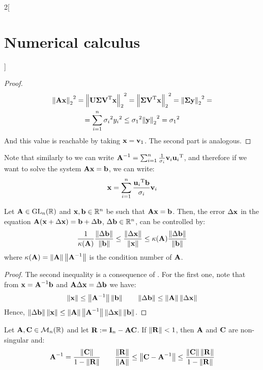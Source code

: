 \documentclass[../../../main_math.tex]{subfiles}
\begin{document}
\begin{multicols}{2}[\section{Numerical calculus}]
\begin{proof}
    \begin{multline*}
      {\norm{\vf{Ax}}_2}^2={\norm{\vf{U}\vf{\Sigma}\transpose{\vf{V}}\vf{x}}_2}^2={\norm{\vf{\Sigma}\transpose{\vf{V}}\vf{x}}_2}^2={\norm{\vf\Sigma \vf{y}}_2}^2 =\\= \sum_{i=1}^n {\sigma_i}^2 {y_i}^2 \leq {\sigma_1}^2{\norm{\vf{y}}_2}^2 = {\sigma_1}^2
    \end{multline*}
    And this value is reachable by taking $\vf{x}=\vf{v}_1$. The second part is analogous.
  \end{proof}
  \begin{remark}
    Note that similarly to  we can write $\vf{A}^{-1}= \sum_{i=1}^n \frac{1}{\sigma_i} \vf{v}_i\transpose{\vf{u}_i}$, and therefore if we want to solve the system $\vf{Ax}=\vf{b}$, we can write:
    $$
      \vf{x} = \sum_{i=1}^n \frac{\transpose{\vf{u}_i}\vf{b}}{\sigma_i}\vf{v}_i
    $$
  \end{remark}
  \begin{theorem}
    Let $\vf{A}\in\GL_n(\RR)$ and $\vf{x}, \vf{b}\in\RR^n$ be such that $\vf{Ax}=\vf{b}$. Then, the error $\Delta \vf{x}$ in the equation $\vf{A}(\vf{x}+\Delta\vf{x})=\vf{b} + \Delta\vf{b}$, $\Delta \vf{b}\in\RR^n$, can be controlled by:
    $$
      \frac{1}{\kappa(\vf{A})}\frac{\norm{\Delta\vf{b}}}{\norm{\vf{b}}} \leq \frac{\norm{\Delta\vf{x}}}{\norm{\vf{x}}} \leq \kappa(\vf{A})\frac{\norm{\Delta\vf{b}}}{\norm{\vf{b}}}
    $$
    where $\kappa(\vf{A})=\norm{\vf{A}}\norm{\vf{A}^{-1}}$ is the condition number of $\vf{A}$.
  \end{theorem}
  \begin{proof}
    The second inequality is a consequence of . For the first one, note that from $\vf{x}=\vf{A}^{-1}\vf{b}$ and $\vf{A}\Delta\vf{x}=\Delta\vf{b}$ we have:
    $$
      \norm{\vf{x}}\leq \norm{\vf{A}^{-1}}\norm{\vf{b}} \qquad \norm{\Delta\vf{b}}\leq \norm{\vf{A}}\norm{\Delta\vf{x}}
    $$
    Hence, $\norm{\Delta\vf{b}}\norm{\vf{x}}\leq \norm{\vf{A}}\norm{\vf{A}^{-1}}\norm{\Delta\vf{x}}\norm{\vf{b}}$.
  \end{proof}
  \begin{proposition}
    Let $\vf{A},\vf{C}\in\mathcal{M}_n(\RR)$ and let $\vf{R}:=\vf{I}_n-\vf{AC}$. If $\norm{\vf{R}}<1$, then $\vf{A}$ and $\vf{C}$ are non-singular and:
    $$
      \vf{A}^{-1} = \frac{\norm{\vf{C}}}{1-\norm{\vf{R}}}\qquad \frac{\norm{\vf{R}}}{\norm{\vf{A}}}\leq \norm{\vf{C}-\vf{A}^{-1}}\leq \frac{\norm{\vf{C}}\norm{\vf{R}}}{1-\norm{\vf{R}}}
    $$
  \end{proposition}

\end{multicols}
\end{document}
